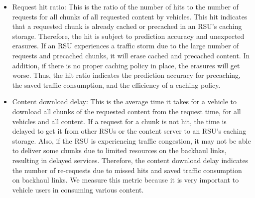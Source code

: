 \documentclass[journal]{IEEEtran}
\begin{document}
\begin{itemize}
    \item Request hit ratio: This is the ratio of the number of hits to the number of requests for all chunks of all requested content by vehicles.
    This hit indicates that a requested chunk is already cached or precached in an RSU's caching storage.
    Therefore, the hit is subject to prediction accuracy and unexpected erasures.
    If an RSU experiences a traffic storm due to the large number of requests and precached chunks, it will erase cached and precached content.
    In addition, if there is no proper caching policy in place, the erasures will get worse.
    Thus, the hit ratio indicates the prediction accuracy for precaching, the saved traffic consumption, and the efficiency of a caching policy.

    \item Content download delay: This is the average time it takes for a vehicle to download all chunks of the requested content from the request time, for all vehicles and all content.
    If a request for a chunk is not hit, the time is delayed to get it from other RSUs or the content server to an RSU's caching storage.
    Also, if the RSU is experiencing traffic congestion, it may not be able to deliver some chunks due to limited resources on the backhaul links, resulting in delayed services.
    Therefore, the content download delay indicates the number of re-requests due to missed hits and saved traffic consumption on backhaul links.
    We measure this metric because it is very important to vehicle users in consuming various content.
    

\end{itemize}
\end{document}
